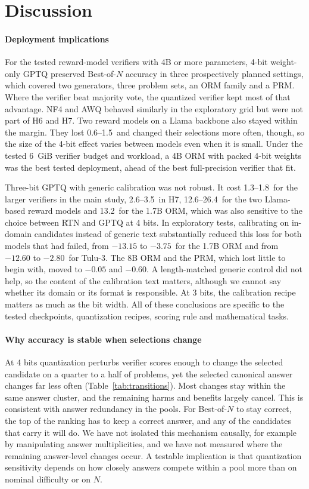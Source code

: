 \section{Discussion}\label{sec:discussion}

\paragraph{Deployment implications} For the tested reward-model verifiers with 4B or
more parameters, 4-bit weight-only GPTQ preserved Best-of-$N$ accuracy in three
prospectively planned settings, which covered two generators, three problem sets, an
ORM family and a PRM. Where the verifier beat majority vote, the quantized verifier kept
most of that advantage. NF4 and AWQ behaved similarly in the exploratory grid but were
not part of H6 and H7. Two reward models on a Llama backbone also stayed
within the margin. They lost 0.6--1.5\pp\ and changed their selections more often,
though, so the size of the 4-bit effect varies between models even when it is small.
Under the tested 6~GiB verifier budget and workload, a 4B ORM with packed 4-bit weights
was the best tested deployment, ahead of the best full-precision verifier that fit.

Three-bit GPTQ with generic calibration was not robust. It cost 1.3--1.8\pp\ for the
larger verifiers in the main study, 2.6--3.5\pp\ in H7, 12.6--26.4\pp\ for the two
Llama-based reward models and 13.2\pp\ for the 1.7B ORM, which was also sensitive to the
choice between RTN and GPTQ at 4 bits. In exploratory tests, calibrating on in-domain
candidates instead of generic text substantially reduced this loss for both models that
had failed, from $-13.15$ to $-3.75$\pp\ for the 1.7B ORM and from $-12.60$ to
$-2.80$\pp\ for Tulu-3. The 8B ORM and the PRM, which lost little to begin with, moved
to $-0.05$ and $-0.60$\pp. A length-matched generic control did not help, so the
content of the calibration text matters, although we cannot say whether its domain or
its format is responsible. At 3 bits, the calibration recipe matters as much as the bit
width. All of
these conclusions are specific to the tested checkpoints, quantization recipes, scoring
rule and mathematical tasks.

\paragraph{Why accuracy is stable when selections change} At 4 bits quantization
perturbs verifier scores enough to change the selected candidate on a quarter to a half
of problems, yet the selected canonical answer changes far less often
(Table~\ref{tab:transitions}). Most changes stay within the same answer cluster, and the
remaining harms and benefits largely cancel. This is consistent with answer redundancy
in the pools. For Best-of-$N$ to stay correct, the top of the ranking has to keep a
correct answer, and any of the candidates that carry it will do. We have not isolated
this mechanism causally, for example by manipulating answer multiplicities, and we have
not measured where the remaining answer-level changes occur. A testable implication is
that quantization sensitivity depends on how closely answers compete within a pool more
than on nominal difficulty or on $N$.

